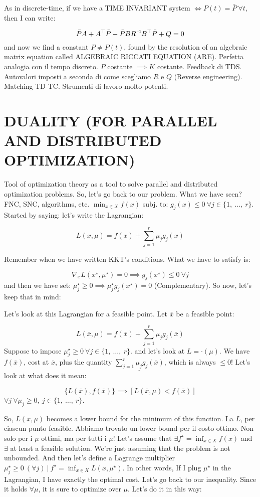 As in discrete-time, if we have a TIME INVARIANT system $\iff P(t) = \bar{P}\ \forall t$, then I can write:

\[
	\bar{P}A + A^\top\bar{P} -\bar{P}B\inv{R}B^\top\bar{P} + Q = 0
\]
and now we find a constant $P\neq P(t)$, found by the resolution of an algebraic matrix equation called ALGEBRAIC RICCATI EQUATION (ARE). Perfetta analogia con il tempo discreto. $P$ costante $\implies K$ costante. Feedback di TDS. Autovalori imposti a seconda di come scegliamo $R$ e $Q$ (Reverse engineering).
Matching TD-TC. Strumenti di lavoro molto potenti.

\section{DUALITY (FOR PARALLEL AND DISTRIBUTED OPTIMIZATION)}

Tool of optimization theory as a tool to solve parallel and distributed optimization problems. So, let's go back to our problem. What we have seen? FNC, SNC, algorithms, etc. $\min_{x\in X}{f(x)}$ subj. to: $g_j(x)\leq 0\ \forall j\in\{1,\ \dots,\ r\}$. Started by saying: let's write the Lagrangian:

\[
	L(x,\mu) = f(x) + \sum_{j=1}^r{\mu_jg_j(x)}
\]

Remember when we have written KKT's conditions. What we have to satisfy is:

\[
	\nabla_x{L(x^\star,\mu^\star)} = 0 \implies g_j(x^\star)\leq 0\ \forall j
\]
and then we have set: $\mu_j^\star \geq 0 \implies \mu_j^\star g_j(x^\star) = 0$ (Complementary). So now, let's keep that in mind:

Let's look at this Lagrangian for a feasible point. Let $\bar{x}$ be a feasible point:

\[
	L(\bar{x},\mu) = f(\bar{x}) + \sum_{j=1}^r{\mu_jg_j(\bar{x})}
\]
Suppose to impose $\mu_j^\star \geq 0\ \forall j\in\{1,\ \dots,\ r\}$. and let's look at $L = \mathord{\cdot}(\mu)$. We have $f(\bar{x})$, cost at $\bar{x}$, plus the quantity $\underline{\sum_{j=1}^r{\mu_jg_j(\bar{x})}}$, which is always $\leq 0$! Let's look at what does it mean:

\[
	\{L(\bar{x}),f(\bar{x})\} \implies [L(\bar{x},\mu) < f(\bar{x})]
\]
$\forall j\ \forall\mu_j \geq 0,\ j\in\{1,\ \dots,\ r\}$.

So, $L(\bar{x},\mu)$ becomes a lower bound for the minimum of this function. La $L$, per ciascun punto feasible. Abbiamo trovato un lower bound per il costo ottimo. Non solo per i $\mu$ ottimi, ma per tutti i $\mu$!
Let's assume that $\exists f^\star = \inf_{x\in X}{f(x)}$ and $\exists$ at least a feasible solution. We're just assuming that the problem is not unbounded. And then let's define a Lagrange multiplier $\mu_j^\star\geq 0\ (\forall j)\ |\ f^\star = \inf_{x\in X}{L(x,\mu^\star)}$. In other words, If I plug $\mu^\star$ in the Lagrangian, I have exactly the optimal cost. Let's go back to our inequality. Since it holds $\forall\mu$, it is sure to optimize over $\mu$. Let's do it in this way:

